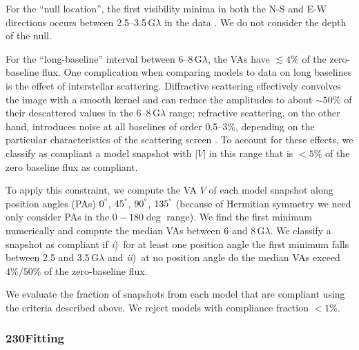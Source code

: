 For the ``null location'', the first visibility minima in both the N-S
and E-W directions occurs between 2.5--3.5\,$\mathrm{G}\lambda$ in the
data .
We do not consider the depth of the null.

For the ``long-baseline'' interval between 6--8\,$\mathrm{G}\lambda$,
the VAs have $\lesssim 4\%$ of the zero-baseline flux.
One complication when comparing models to data on long baselines is
the effect of interstellar scattering.
Diffractive scattering effectively convolves the image with a smooth
kernel and can reduce the amplitudes to about $\sim 50\%$ of their
descattered values in the 6--8\,$\mathrm{G}\lambda$ range; refractive
scattering, on the other hand, introduces noise at all baselines of
order 0.5--3\%, depending on the particular characteristics of the
scattering screen \citep{2018arXiv180501242P, 2018ApJ...865..104J}.
To account for these effects, we classify as compliant a model snapshot with $|V|$
in this range that is $< 5\%$ of the zero baseline flux as compliant.

To apply this constraint, we compute the VA $V$ of each model snapshot
along position angles (PAs) $0^\degree$, $45^\degree$, $90^\degree$,
$135^\degree$ (because of Hermitian symmetry we need only consider PAs in the $0-180\deg$ range).
We find the first minimum numerically and compute the median VAs
between 6 and 8\,$\mathrm{G}\lambda$.
We classify a snapshot as compliant if
\emph{i})~for at least one position angle the first minimum falls
between 2.5 and 3.5\,$\mathrm{G}\lambda$ and
\emph{ii})~at no position angle do the median VAs exceed $4\% /
50\%$ of the zero-baseline flux.

We evaluate the fraction of snapshots from each model that are
compliant using the criteria described above.
We reject models with compliance fraction $< 1\%$.

\subsubsection{230\GHz \Mring Fitting}

